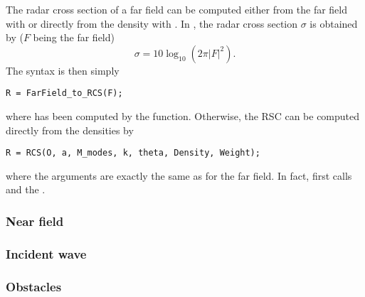 The radar cross section of a far field can be computed either from the far field with  or directly from the density with . In \mudiff, the radar cross section $\sigma$ is obtained by ($F$ being the far field)
$$
\sigma = 10\log_{10}(2\pi|F|^2).
$$
The syntax is then simply
\begin{verbatim}
R = FarField_to_RCS(F);
\end{verbatim}
where  has been computed by the  function. Otherwise, the RSC can be computed directly from the densities by
\begin{verbatim}
R = RCS(O, a, M_modes, k, theta, Density, Weight);
\end{verbatim}
where the arguments are exactly the same as for the far field. In fact,  first calls  and the .

\subsubsection{Near field}

\subsubsection{Incident wave}

\subsubsection{Obstacles}

